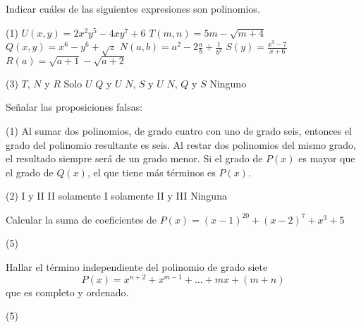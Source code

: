\begin{multicols}{2}

    \begin{exercise}
        Indicar cuáles de las siguientes expresiones son polinomios.
        \begin{tasks}[label=\arabic*.](1)
            \task $U(x,y) = 2x^2 y^5 - 4xy^7 + 6$
            \task $T(m,n) = 5m - \sqrt {m + 4}$
            \task $Q(x,y) = x^6 - y^6 + \sqrt {z}$
            \task $N(a, b) = a^2 - 2\frac{a}{b} + \frac{1}{b^2}$
            \task $S(y) = \frac{x^3 - 7}{x + 6}$
            \task $R(a) = \sqrt {a + 1} - \sqrt {a + 2}$
        \end{tasks}
        \begin{tasks}(3)
            \task $T$, $N$ y $R$
            \task Solo $U$
            \task $Q$ y $U$
            \task $N$, $S$ y $U$
            \task $N$, $Q$ y $S$
            \task Ninguno
        \end{tasks}
    \end{exercise}

    \begin{exercise}
        Señalar las proposiciones falsas:
        \begin{tasks}[label=\Roman*.](1)
            \task Al sumar dos polinomios, de grado cuatro con uno de grado seis, entonces el grado del polinomio resultante es seis.
            \task Al restar dos polinomios del mismo grado, el resultado siempre será de un grado menor.
            \task Si el grado de $P(x)$ es mayor que el grado de $Q(x)$, el que tiene más términos es $P(x)$.
        \end{tasks}
        \begin{tasks}(2)
            \task I y II
            \task II solamente
            \task I solamente
            \task II y III
            \task Ninguna
        \end{tasks}
    \end{exercise}

    \begin{exercise}
        Calcular la suma de coeficientes de $P(x) = (x - 1)^{20} + (x - 2)^7 + x^3 + 5$
        \begin{tasks}(5)
        \end{tasks}
    \end{exercise}

    \begin{exercise}
        Hallar el término independiente del polinomio de grado siete
        \[
            P(x) = x^{n + 2} + x^{m - 1} + \ldots + mx + (m + n)
        \]
        que es completo y ordenado.
        \begin{tasks}(5)
        \end{tasks}
    \end{exercise}


\end{multicols}
